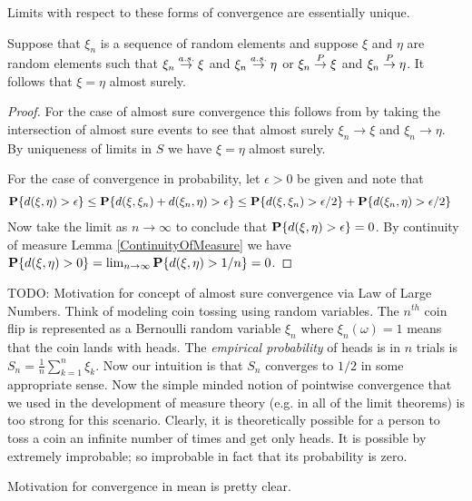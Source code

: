Limits with respect to these forms of convergence are essentially
unique.
\begin{prop}\label{AlmostSureUniquenessOfLimits}Suppose that $\xi_n$ is a sequence of random elements and
  suppose $\xi$ and $\eta$ are random elements such that $\xi_n \overset{a.s.}\to
  \xi$ and $\xi_n \overset{a.s.}\to \eta$ or $\xi_n \overset{P}\to
  \xi$ and $\xi_n \overset{P}\to \eta$.  It follows that $\xi = \eta$
  almost surely.
\end{prop}
\begin{proof}
For the case  of almost sure convergence this follows from by taking
the intersection of almost sure events to see that almost surely
$\xi_n \to \xi$ and $\xi_n \to \eta$.  By uniqueness of limits in $S$
we have $\xi = \eta$ almost surely.

For the case of convergence in probability, let $\epsilon > 0$ be
given and note that 
\begin{align*}
\textbf{P}\{ d(\xi, \eta) > \epsilon\} &\leq \textbf{P}\{ d(\xi,
  \xi_n )  + d(\xi_n , \eta) > \epsilon\} \leq  \textbf{P}\{ d(\xi,
  \xi_n ) > \epsilon/2 \} + \textbf{P}\{ d(\xi_n , \eta) > \epsilon/2\} 
\end{align*}
Now take the limit as $n \to \infty$ to conclude that $\textbf{P}\{
  d(\xi, \eta) > \epsilon\} = 0$.  By continuity of measure Lemma
\ref{ContinuityOfMeasure} we have $\textbf{P}\{d(\xi, \eta) > 0\} =
\lim_{n \to \infty} \textbf{P}\{d(\xi, \eta) > 1/n\} = 0$.
\end{proof}

TODO: Motivation for concept of almost sure convergence via Law of
Large Numbers.  Think of modeling coin tossing using random
variables.  The $n^{th}$ coin flip is represented as a Bernoulli
random variable $\xi_n$ where $\xi_n(\omega) = 1$ means that the coin
lands with heads.  The \emph{empirical probability} of heads is in $n$
trials is $S_n = \frac{1}{n} \sum_{k=1}^n \xi_k$.  Now our intuition
is that $S_n$ converges to $1/2$ in some appropriate sense.  Now the
simple minded notion of pointwise convergence that we used in the
development of measure theory (e.g. in all of the limit theorems)
is too strong for this scenario.  Clearly, it is theoretically
possible for a person to toss a coin an infinite number of times and
get only heads.  It is possible by extremely improbable; so improbable
in fact that its probability is zero.

Motivation for convergence in mean is pretty clear.

